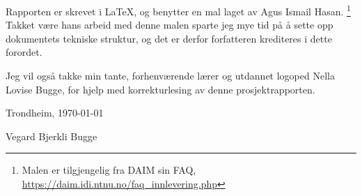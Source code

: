 Rapporten er skrevet i \LaTeX, og benytter en mal laget av Agus Ismail Hasan. \footnote{Malen er tilgjengelig fra DAIM sin FAQ, \url{https://daim.idi.ntnu.no/faq_innlevering.php}} Takket være hans arbeid med denne malen sparte jeg mye tid på å sette opp dokumentets tekniske struktur, og det er derfor forfatteren krediteres i dette forordet.

Jeg vil også takke min tante, forhenværende lærer og utdannet logoped Nella Lovise Bugge, for hjelp med korrekturlesing av denne prosjektrapporten.

\begin{flushright}
Trondheim, \today

Vegard Bjerkli Bugge
\end{flushright}

\cleardoublepage
